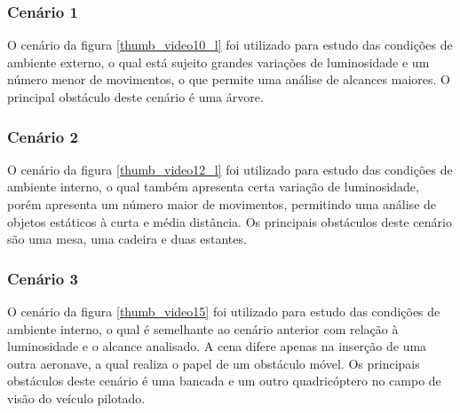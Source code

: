 \subsubsection{Cenário 1}

O cenário da figura \ref{thumb_video10_l} foi utilizado para estudo das condições de ambiente externo, o qual está sujeito grandes variações de luminosidade e um número menor de movimentos, o que permite uma análise de alcances maiores. O principal  obstáculo deste cenário é uma árvore. 


\subsubsection{Cenário 2}

O cenário da figura \ref{thumb_video12_l} foi utilizado para estudo das condições de ambiente interno, o qual também apresenta certa variação de luminosidade, porém apresenta um número maior de movimentos, permitindo uma análise de objetos estáticos à curta e média distância. Os principais obstáculos deste cenário são uma mesa, uma cadeira e duas estantes.


\subsubsection{Cenário 3}

O cenário da figura \ref{thumb_video15} foi utilizado para estudo das condições de ambiente interno, o qual é semelhante ao cenário anterior com relação à luminosidade e o alcance analisado. A cena difere apenas na inserção de uma outra aeronave, a qual realiza o papel de um obstáculo móvel. Os principais obstáculos deste cenário é uma bancada e um outro quadricóptero no campo de visão do veículo pilotado.


